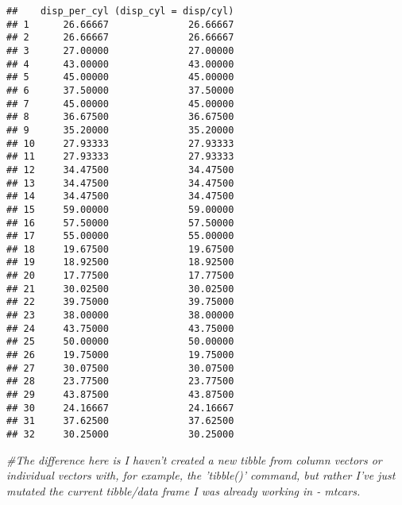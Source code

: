 \documentclass[
]{article}
\newenvironment{Shaded}{\begin{snugshade}}{\end{snugshade}}
\newcommand{\CommentTok}[1]{\textcolor[rgb]{0.56,0.35,0.01}{\textit{#1}}}
\newcommand{\DataTypeTok}[1]{\textcolor[rgb]{0.13,0.29,0.53}{#1}}
\newcommand{\DecValTok}[1]{\textcolor[rgb]{0.00,0.00,0.81}{#1}}
\newcommand{\KeywordTok}[1]{\textcolor[rgb]{0.13,0.29,0.53}{\textbf{#1}}}
\newcommand{\NormalTok}[1]{#1}
\newcommand{\OperatorTok}[1]{\textcolor[rgb]{0.81,0.36,0.00}{\textbf{#1}}}
\newcommand{\StringTok}[1]{\textcolor[rgb]{0.31,0.60,0.02}{#1}}
\begin{document}
\begin{Shaded}
\end{Shaded}

\begin{verbatim}
##    disp_per_cyl (disp_cyl = disp/cyl)
## 1      26.66667              26.66667
## 2      26.66667              26.66667
## 3      27.00000              27.00000
## 4      43.00000              43.00000
## 5      45.00000              45.00000
## 6      37.50000              37.50000
## 7      45.00000              45.00000
## 8      36.67500              36.67500
## 9      35.20000              35.20000
## 10     27.93333              27.93333
## 11     27.93333              27.93333
## 12     34.47500              34.47500
## 13     34.47500              34.47500
## 14     34.47500              34.47500
## 15     59.00000              59.00000
## 16     57.50000              57.50000
## 17     55.00000              55.00000
## 18     19.67500              19.67500
## 19     18.92500              18.92500
## 20     17.77500              17.77500
## 21     30.02500              30.02500
## 22     39.75000              39.75000
## 23     38.00000              38.00000
## 24     43.75000              43.75000
## 25     50.00000              50.00000
## 26     19.75000              19.75000
## 27     30.07500              30.07500
## 28     23.77500              23.77500
## 29     43.87500              43.87500
## 30     24.16667              24.16667
## 31     37.62500              37.62500
## 32     30.25000              30.25000
\end{verbatim}

\begin{Shaded}
\begin{Highlighting}[]
\CommentTok{#The difference here is I haven't created a new tibble from column vectors or individual vectors with, for example, the 'tibble()' command, but rather I've just mutated the current tibble/data frame I was already working in - mtcars. }
\end{Highlighting}
\end{Shaded}
\end{document}
